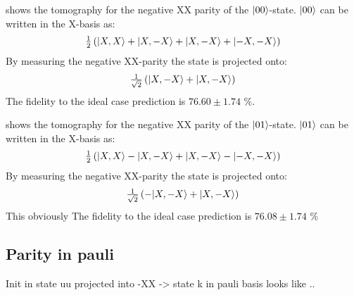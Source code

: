  shows the tomography for the negative XX parity of the ${\left\vert{00}\right\rangle}$-state.
${\left\vert{00}\right\rangle}$ can be written in the X-basis as:
\begin{equation}
      \tfrac{1}{2} \left( {\left\vert{X,X}\right\rangle} + {\left\vert{X,-X}\right\rangle} +{\left\vert{X,-X}\right\rangle} + {\left\vert{-X,-X}\right\rangle} \right)
 \end{equation}
By measuring the negative XX-parity the state is projected onto:
\begin{equation}
    \tfrac{1}{\sqrt{2}} \left( {\left\vert{X,-X}\right\rangle} +{\left\vert{X,-X}\right\rangle} \right)
\end{equation}
The fidelity to the ideal case prediction is $76.60 \pm 1.74$ \%.


 shows the tomography for the negative XX parity of the ${\left\vert{01}\right\rangle}$-state.
${\left\vert{01}\right\rangle}$ can be written in the X-basis as:
\begin{equation}
    \tfrac{1}{2} \left( {\left\vert{X,X}\right\rangle} - {\left\vert{X,-X}\right\rangle} +{\left\vert{X,-X}\right\rangle} - {\left\vert{-X,-X}\right\rangle} \right)
 \end{equation}
By measuring the negative XX-parity the state is projected onto:
\begin{equation}
    \tfrac{1}{\sqrt{2}} \left( -{\left\vert{X,-X}\right\rangle} +{\left\vert{X,-X}\right\rangle} \right)
\end{equation}
This obviously
The fidelity to the ideal case prediction is  $76.08 \pm 1.74$ \%

\subsection{Parity in pauli}



Init in state uu
projected into -XX
-> state k
in pauli basis looks like ..



